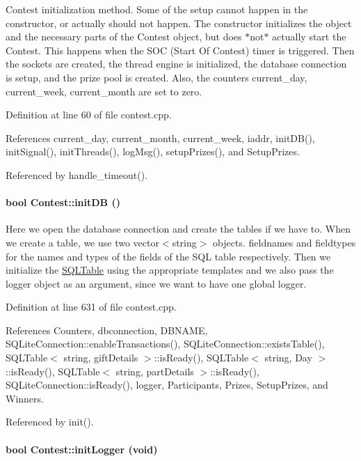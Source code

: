 Contest initialization method. Some of the setup cannot happen in the constructor, or actually should not happen. The constructor initializes the object and the necessary parts of the Contest object, but does $\ast$not$\ast$ actually start the Contest. This happens when the SOC (Start Of Contest) timer is triggered. Then the sockets are created, the thread engine is initialized, the database connection is setup, and the prize pool is created. Also, the counters current\_\-day, current\_\-week, current\_\-month are set to zero. 

Definition at line 60 of file contest.cpp.

References current\_\-day, current\_\-month, current\_\-week, iaddr, init\-DB(), init\-Signal(), init\-Threads(), log\-Msg(), setup\-Prizes(), and Setup\-Prizes.

Referenced by handle\_\-timeout().\hypertarget{classContest_Contesta11}{
\paragraph[initDB]{\setlength{\rightskip}{0pt plus 5cm}bool Contest::init\-DB ()}\hfill}
\label{classContest_Contesta11}


Here we open the database connection and create the tables if we have to. When we create a table, we use two vector$<$string$>$ objects. fieldnames and fieldtypes for the names and types of the fields of the SQL table respectively. Then we initialize the \hyperlink{classSQLTable}{SQLTable} using the appropriate templates and we also pass the logger object as an argument, since we want to have one global logger. 

Definition at line 631 of file contest.cpp.

References Counters, dbconnection, DBNAME, SQLite\-Connection::enable\-Transactions(), SQLite\-Connection::exists\-Table(), SQLTable$<$ string, gift\-Details $>$::is\-Ready(), SQLTable$<$ string, Day $>$::is\-Ready(), SQLTable$<$ string, part\-Details $>$::is\-Ready(), SQLite\-Connection::is\-Ready(), logger, Participants, Prizes, Setup\-Prizes, and Winners.

Referenced by init().\hypertarget{classContest_Contesta12}{
\paragraph[initLogger]{\setlength{\rightskip}{0pt plus 5cm}bool Contest::init\-Logger (void)}\hfill}
\label{classContest_Contesta12}



